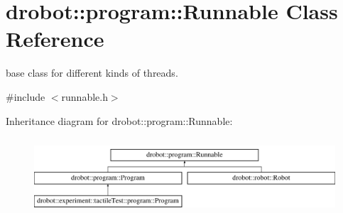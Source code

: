 \hypertarget{classdrobot_1_1program_1_1Runnable}{\section{drobot\-:\-:program\-:\-:Runnable Class Reference}
\label{classdrobot_1_1program_1_1Runnable}
}


base class for different kinds of threads.  




{\ttfamily \#include $<$runnable.\-h$>$}

Inheritance diagram for drobot\-:\-:program\-:\-:Runnable\-:\begin{figure}[H]
\begin{center}
\leavevmode
\includegraphics[height=2.876712cm]{classdrobot_1_1program_1_1Runnable}
\end{center}
\end{figure}
